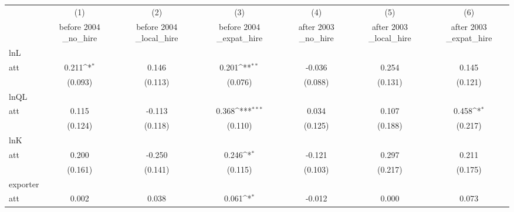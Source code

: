 {
\def\sym#1{\ifmmode^{#1}\else\(^{#1}\)\fi}
\begin{tabular}{l*{6}{c}}
\hline\hline
            &\multicolumn{1}{c}{(1)}&\multicolumn{1}{c}{(2)}&\multicolumn{1}{c}{(3)}&\multicolumn{1}{c}{(4)}&\multicolumn{1}{c}{(5)}&\multicolumn{1}{c}{(6)}\\
            &\multicolumn{1}{c}{before 2004  \_no\_hire}&\multicolumn{1}{c}{before 2004  \_local\_hire}&\multicolumn{1}{c}{before 2004  \_expat\_hire}&\multicolumn{1}{c}{after 2003  \_no\_hire}&\multicolumn{1}{c}{after 2003  \_local\_hire}&\multicolumn{1}{c}{after 2003  \_expat\_hire}\\
\hline
lnL         &                     &                     &                     &                     &                     &                     \\
att         &       0.211\sym{*}  &       0.146         &       0.201\sym{**} &      -0.036         &       0.254         &       0.145         \\
            &     (0.093)         &     (0.113)         &     (0.076)         &     (0.088)         &     (0.131)         &     (0.121)         \\
\hline
lnQL        &                     &                     &                     &                     &                     &                     \\
att         &       0.115         &      -0.113         &       0.368\sym{***}&       0.034         &       0.107         &       0.458\sym{*}  \\
            &     (0.124)         &     (0.118)         &     (0.110)         &     (0.125)         &     (0.188)         &     (0.217)         \\
\hline
lnK         &                     &                     &                     &                     &                     &                     \\
att         &       0.200         &      -0.250         &       0.246\sym{*}  &      -0.121         &       0.297         &       0.211         \\
            &     (0.161)         &     (0.141)         &     (0.115)         &     (0.103)         &     (0.217)         &     (0.175)         \\
\hline
exporter    &                     &                     &                     &                     &                     &                     \\
att         &       0.002         &       0.038         &       0.061\sym{*}  &      -0.012         &       0.000         &       0.073         \\

\end{tabular}}
